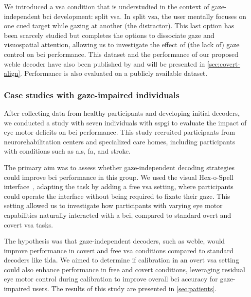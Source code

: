 We introduced a \ac{vsa} condition that is understudied in the context of
gaze-independent \ac{bci} development: split \ac{vsa}.
In split \ac{vsa}, the user mentally focuses on one cued target while gazing at
another (the distractor).
This last option has been scarcely studied but completes
the options to dissociate gaze and visuospatial attention, allowing us to
investigate the effect of (the lack of) gaze control on \ac{bci} performance.
This dataset and the performance of our proposed \ac{wcble} decoder have also been
published by \textcite{VanDenKerchove2024} and will be presented in
\cref{sec:covert-align}.
Performance is also evaluated on a publicly available dataset.

\subsubsection{Case studies with gaze-impaired individuals}
\label{sec:patients/approach/casestudies}

After collecting data from healthy participants and developing initial decoders, we conducted
a study with seven individuals with \ac{sspgi} to evaluate the impact of eye motor deficits
on \ac{bci} performance.
This study recruited participants from neurorehabilitation centers
and specialized care homes, including participants with conditions such as \ac{als}, \ac{fa},
and stroke.

The primary aim was to assess whether gaze-independent decoding strategies could improve
\ac{bci} performance in this group.
We used the visual Hex-o-Spell interface~\cite{Treder2010}, adapting the task by adding a
free \ac{vsa} setting, where participants could operate the interface without being required
to fixate their gaze.
This setting allowed us to investigate how participants with varying eye motor capabilities
naturally interacted with a \ac{bci}, compared to standard overt and covert \ac{vsa} tasks.

The hypothesis was that gaze-independent decoders, such as \ac{wcble},
would improve performance in covert and free \ac{vsa} conditions compared to standard
decoders like \ac{tlda}.
We aimed to determine if calibration in an overt \ac{vsa} setting could also enhance
performance in free and covert conditions, leveraging residual eye motor control during
calibration to improve overall \ac{bci} accuracy for gaze-im\-pair\-ed users.
The results of this study are presented in \cref{sec:patients}.
